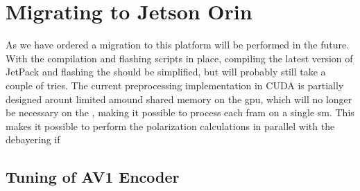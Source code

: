 \section{Migrating to Jetson Orin}
As we have ordered a \jo migration to this platform will be performed in the future.
With the compilation and flashing scripts in place, compiling the latest version of JetPack and flashing the \jo should be simplified, but will probably still take a couple of tries.
The current preprocessing implementation in CUDA is partially designed arount limited amound shared memory on the \jx \gls{gpu}, which will no longer be necessary on the \jo, making it possible to process each fram on a single \gls{sm}.
This makes it possible to perform the polarization calculations in parallel with the debayering if

\subsection{Tuning of AV1 Encoder}
\todo

